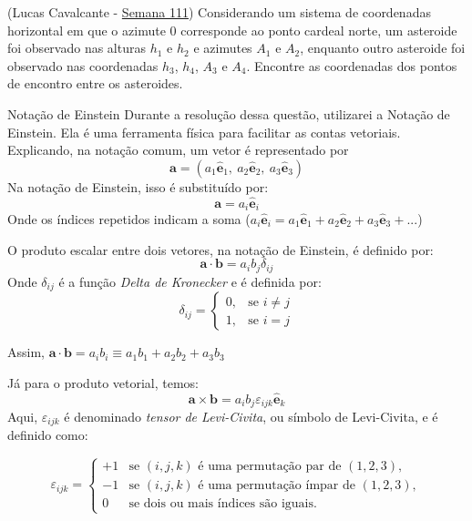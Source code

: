 \documentclass[11pt]{article}
\begin{document}
\begin{pproblem}(Lucas Cavalcante - \href{https://noic.com.br/olimpiadas/astronomia/problemas-da-semana/astronomia-semana-111/}{Semana 111})
    Considerando um sistema de coordenadas horizontal em que o azimute \(0\) corresponde ao ponto cardeal norte, um asteroide foi observado nas alturas \(h_1\) e \(h_2\) e azimutes \(A_1\) e \(A_2\), enquanto outro asteroide foi observado nas coordenadas \(h_3\), \(h_4\), \(A_3\) e \(A_4\). Encontre as coordenadas dos pontos de encontro entre os asteroides.
    
    \begin{psidea}{Notação de Einstein}{}
    Durante a resolução dessa questão, utilizarei a Notação de Einstein. Ela é uma ferramenta física para facilitar as contas vetoriais. Explicando, na notação comum, um vetor é representado por
    \[\mathbf{a} = (a_1 \hat{\mathbf{e}}_1, \ a_2 \hat{\mathbf{e}}_2, \ a_3 \hat{\mathbf{e}}_3)\]
    Na notação de Einstein, isso é substituído por:
    \[\mathbf{a} = a_i \hat{\mathbf{e}}_i\]
    Onde os índices repetidos indicam a soma (\(a_i \hat{\mathbf{e}}_i = a_1 \hat{\mathbf{e}}_1 + a_2 \hat{\mathbf{e}}_2 + a_3 \hat{\mathbf{e}}_3 + ...\))
    
    O produto escalar entre dois vetores, na notação de Einstein, é definido por:
    \[\mathbf{a}\cdot \mathbf{b} = a_i b_j \delta_{ij}\]
    Onde \(\delta_{ij}\) é a função \textit{Delta de Kronecker} e é definida por:
    \[\delta_{ij} = \left \{ \begin{matrix} 0, & \mbox{se } i \ne j \\ 
                                            1, & \mbox{se } i = j\end{matrix} \right.\]
    
    Assim, \(\mathbf{a}\cdot \mathbf{b} = a_i b_i \equiv a_1 b_1 + a_2 b_2 + a_3 b_3\)

    Já para o produto vetorial, temos:
        \[
        \mathbf{a} \times \mathbf{b} = a_i b_j \varepsilon_{ijk} \hat{\mathbf{e}}_k
        \]
        Aqui, \(\varepsilon_{ijk}\) é denominado \textit{tensor de Levi-Civita}, ou símbolo de Levi-Civita, e é definido como:
    
        \[
        \varepsilon_{ijk} = 
        \begin{cases} 
        +1 & \text{se } (i, j, k) \text{ é uma permutação par de } (1, 2, 3), \\
        -1 & \text{se } (i, j, k) \text{ é uma permutação ímpar de } (1, 2, 3), \\
        0 & \text{se dois ou mais índices são iguais}.
        \end{cases}
        \]


\end{psidea}
\end{pproblem}
\end{document}
